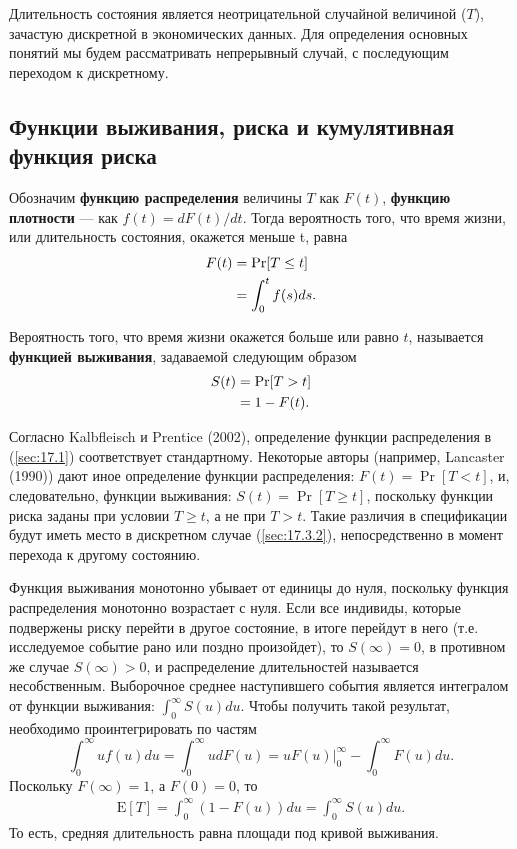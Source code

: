 \noindent
Длительность состояния является неотрицательной случайной величиной ($T$), зачастую дискретной в экономических данных. Для определения основных понятий мы будем рассматривать непрерывный случай, с последующим переходом к дискретному.


\subsection{Функции выживания, риска и кумулятивная функция риска}\label{sec:17.3.1}

\noindent
Обозначим \textbf{функцию распределения} величины $T$ как $F(t)$, \textbf{функцию плотности}  --- как $f(t) = dF(t) / dt$. Тогда вероятность того, что время жизни, или длительность состояния, окажется меньше t, равна
    \begin{align}
    \label{eq:17.1}
    F(t) &= \Pr[T \le t]\\
    &= \int^{t}_{0} f(s)ds. \notag
    \end{align}

Вероятность того, что время жизни окажется больше или равно $t$, называется \textbf{функцией выживания}, задаваемой следующим образом
    \begin{align}
    \label{eq:17.2}
    S(t) &= \Pr[T > t]\\
    &= 1 - F(t). \notag
    \end{align}

Согласно Kalbfleisch и Prentice (2002), определение функции распределения в (\ref{sec:17.1}) соответствует стандартному. Некоторые авторы (например, Lancaster (1990)) дают иное определение функции распределения: $F(t) = \Pr[T < t]$, и, следовательно, функции выживания: $S(t) = \Pr[T\ge t]$, поскольку функции риска заданы при условии $T\ge t$, а не при $T>t$.
Такие различия в спецификации будут иметь место в дискретном случае (\ref{sec:17.3.2}), непосредственно в момент перехода к другому состоянию. 

Функция выживания монотонно убывает от единицы до нуля, поскольку функция распределения монотонно возрастает с нуля. Если все индивиды, которые подвержены риску перейти в другое состояние, в итоге перейдут в него (т.е. исследуемое событие рано или поздно произойдет), то $S(\infty) = 0$, в противном же случае $S(\infty) > 0$, и распределение длительностей называется несобственным. Выборочное среднее наступившего события является интегралом от функции выживания: $\int^{\infty}_{0} S(u)du$. Чтобы получить такой результат, необходимо проинтегрировать по частям
    $$\int^{\infty}_{0}uf(u)du = \int^{\infty}_{0}udF(u) = uF(u)|^{\infty}_{0} - \int^{\infty}_{0}F(u)du.$$
Поскольку $F(\infty) = 1$, а $F(0) = 0$, то
    \begin{align}
    \label{eq:17.3}
    \mathrm{E}[T] = \int^{\infty}_{0} (1-F(u))du = \int^{\infty}_{0} S(u)du.
    \end{align}
То есть, средняя длительность равна площади под кривой выживания.

